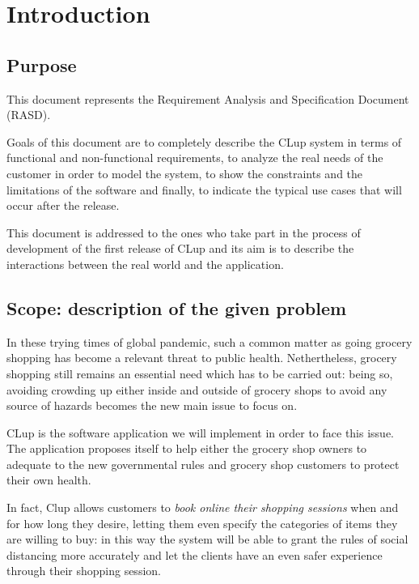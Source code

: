 \section{Introduction}
\label{sect:introduction}

\subsection{Purpose}
\label{subsect:purpose}

This document represents the Requirement Analysis and Specification Document (RASD). 

Goals of this document are to completely describe the CLup system in terms of functional and non-functional requirements, to analyze the real needs of the customer in order to model the system, to show the constraints and the limitations of the software and finally, to indicate the typical use cases that will occur after the release. 

This document is addressed to the ones who take part in the process of development of the first release of CLup and its aim is to describe the interactions between the real world and the application.

\subsection{Scope: description of the given problem}
\label{subsect:scope}

In these trying times of global pandemic, such a common matter as going grocery shopping has become a relevant threat to public health. 
Nethertheless, grocery shopping still remains an essential need which has to be carried out: being so, avoiding crowding up either inside and outside of grocery shops to avoid any source of hazards becomes the new main issue to focus on.

CLup is the software application we will implement in order to face this issue. The application proposes itself to help either the grocery shop owners to adequate to the new governmental rules and grocery shop customers to protect their own health.

In fact, Clup allows customers to \textit{book online their shopping sessions} when and for how long they desire, letting them even specify the categories of items they are willing to buy: in this way the system will be able to grant the rules of social distancing more accurately and let the clients have an even safer experience through their shopping session.

